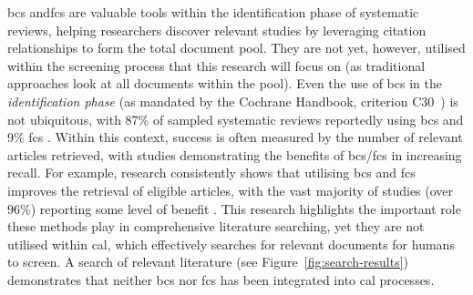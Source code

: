 \documentclass[10pt,oneside]{book}
\begin{document}
\gls*{bcs} and\gls*{fcs} are valuable tools within the identification phase of systematic reviews, helping researchers discover relevant studies by leveraging citation relationships to form the total document pool. They are not yet, however, utilised within the screening process that this research will focus on (as traditional approaches look at all documents within the pool). Even the use of \gls*{bcs} in the \emph{identification phase} (as mandated by the Cochrane Handbook, criterion C30~\cite{noauthor_mecir_nodate}) is not ubiquitous, with 87\% of sampled systematic reviews reportedly using \gls*{bcs} and 9\% \gls*{fcs} \cite{briscoe_conduct_2019}. Within this context, success is often measured by the number of relevant articles retrieved, with studies demonstrating the benefits of \gls*{bcs}/\gls*{fcs} in increasing recall. For example, research consistently shows that utilising \gls*{bcs} and \gls*{fcs} improves the retrieval of eligible articles, with the vast majority of studies (over 96\%) reporting some level of benefit \cite{hirt_citation_2023}. This research highlights the important role these methods play in comprehensive literature searching, yet they are not utilised within \gls*{cal}, which effectively searches for relevant documents for humans to screen. A search of relevant literature (see Figure \ref{fig:search-results}) demonstrates that neither \gls*{bcs} nor \gls*{fcs} has been integrated into \gls*{cal} processes.
\end{document}
